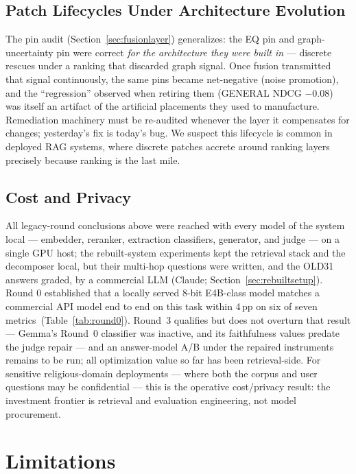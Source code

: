 \subsection{Patch Lifecycles Under Architecture Evolution}

The pin audit (Section~\ref{sec:fusionlayer}) generalizes: the EQ pin
and graph-uncertainty pin were correct \emph{for the architecture they
were built in} --- discrete rescues under a ranking that discarded
graph signal. Once fusion transmitted that signal continuously, the
same pins became net-negative (noise promotion), and the ``regression''
observed when retiring them (GENERAL NDCG $-0.08$) was itself an
artifact of the artificial placements they used to manufacture.
Remediation machinery must be re-audited whenever the layer it
compensates for changes; yesterday's fix is today's bug. We suspect
this lifecycle is common in deployed RAG systems, where discrete
patches accrete around ranking layers precisely because ranking is the
last mile.

\subsection{Cost and Privacy}

All legacy-round conclusions above were reached with every model of the
system local --- embedder, reranker, extraction classifiers, generator,
and judge --- on a single GPU host; the rebuilt-system experiments kept
the retrieval stack and the decomposer local, but their multi-hop
questions were written, and the OLD31 answers graded, by a commercial
LLM (Claude; Section~\ref{sec:rebuiltsetup}). Round 0 established that a locally served 8-bit E4B-class
model matches a commercial API model end to end on this task within
4\,pp on six of seven metrics~(Table~\ref{tab:round0}). Round~3
qualifies but does not overturn that result --- Gemma's Round~0
classifier was inactive, and its faithfulness values predate the judge
repair --- and an answer-model A/B under the repaired instruments
remains to be run; all optimization value so far has been
retrieval-side. For sensitive religious-domain
deployments --- where both the corpus and user questions may be
confidential --- this is the operative cost/privacy result: the
investment frontier is retrieval and evaluation engineering, not model
procurement.

\section{Limitations}
\label{sec:limitations}

